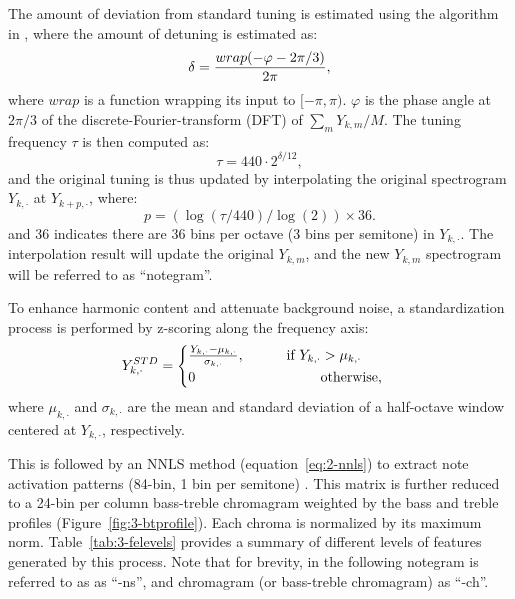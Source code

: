 The amount of deviation from standard tuning is estimated using the algorithm in \cite{dressler2007tuning}, where the amount of detuning is estimated as:
\begin{equation}\label{eq:2-tuning}
	\delta = { {wrap(-\varphi-{2\pi}/3)} \over {2\pi} },
\end{equation}
where $wrap$ is a function wrapping its input to $[-\pi,\pi)$. $\varphi$ is the phase angle at $2\pi/3$ of the discrete-Fourier-transform (DFT) of ${\sum_m Y_{k,m}} / M$. The tuning frequency $\tau$ is then computed as:
\begin{equation}
	\tau=440\cdot2^{\delta/12},
\end{equation}
and the original tuning is thus updated by interpolating the original spectrogram $Y_{k,\cdot}$ at $Y_{{k+p},\cdot}$, where:
\begin{equation}
	p = (\log(\tau / 440) / \log(2)) \times 36.
\end{equation}
and 36 indicates there are 36 bins per octave (3 bins per semitone) in $Y_{k,\cdot}$. The interpolation result will update the original $Y_{k,m}$, and the new $Y_{k,m}$ spectrogram will be referred to as ``notegram''.

To enhance harmonic content and attenuate background noise, a standardization process is performed by z-scoring along the frequency axis:
\begin{equation}
	Y^{STD}_{k,\cdot} = 
	\begin{cases}
		{{Y_{k,\cdot} - \mu_{k,\cdot}} \over \sigma_{k,\cdot}}, \text{\quad\quad\quad if } Y_{k,\cdot} > \mu_{k,\cdot}\\
		0 \quad\quad\quad\quad\quad\quad\quad\quad\quad\text{otherwise,}
	\end{cases}
\end{equation}
where $\mu_{k,\cdot}$ and $\sigma_{k,\cdot}$ are the mean and standard deviation of a half-octave window centered at $Y_{k,\cdot}$, respectively.

This is followed by an NNLS method  (equation~\ref{eq:2-nnls}) to extract note activation patterns (84-bin, 1 bin per semitone) \cite{mauch2010approximate}. This matrix is further reduced to a 24-bin per column bass-treble chromagram weighted by the bass and treble profiles (Figure~\ref{fig:3-btprofile}). Each chroma is normalized by its maximum norm. Table~\ref{tab:3-felevels} provides a summary of different levels of features generated by this process. Note that for brevity, in the following notegram is referred to as as ``-ns'', and chromagram (or bass-treble chromagram) as ``-ch''.

